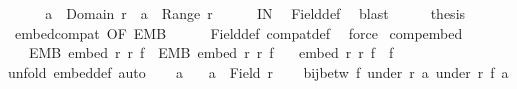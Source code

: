 \begin{isabellebody}
\ {\isacharminus}{\kern0pt}\isanewline
\ \ \isamarkupfalse%
\ {\isachardoublequoteopen}a\ {\isasymin}\ Domain\ r\ {\isasymor}\ a\ {\isasymin}\ Range\ r{\isachardoublequoteclose}\isanewline
\ \ \ \ \isamarkupfalse%
\ IN\ \isamarkupfalse%
\ Field{\isacharunderscore}{\kern0pt}def\ \isamarkupfalse%
\ blast\isanewline
\ \ \isamarkupfalse%
\ \isamarkupfalse%
\ {\isacharquery}{\kern0pt}thesis\isanewline
\ \ \ \ \isamarkupfalse%
\ embed{\isacharunderscore}{\kern0pt}compat\ {\isacharbrackleft}{\kern0pt}OF\ EMB{\isacharbrackright}{\kern0pt}\isanewline
\ \ \ \ \isamarkupfalse%
\ Field{\isacharunderscore}{\kern0pt}def\ compat{\isacharunderscore}{\kern0pt}def\ \isamarkupfalse%
\ force\isanewline
{}\isamarkupfalse%
%
\endisatagproof
{\isafoldproof}%
%
\isadelimproof
\isanewline
%
\endisadelimproof
\isanewline
{}\isamarkupfalse%
\ comp{\isacharunderscore}{\kern0pt}embed{\isacharcolon}{\kern0pt}\isanewline
\ \ \ EMB{\isacharcolon}{\kern0pt}\ {\isachardoublequoteopen}embed\ r\ r{\isacharprime}{\kern0pt}\ f{\isachardoublequoteclose}\ \ EMB{\isacharprime}{\kern0pt}{\isacharcolon}{\kern0pt}\ {\isachardoublequoteopen}embed\ r{\isacharprime}{\kern0pt}\ r{\isacharprime}{\kern0pt}{\isacharprime}{\kern0pt}\ f{\isacharprime}{\kern0pt}{\isachardoublequoteclose}\isanewline
\ \ \ {\isachardoublequoteopen}embed\ r\ r{\isacharprime}{\kern0pt}{\isacharprime}{\kern0pt}\ {\isacharparenleft}{\kern0pt}f{\isacharprime}{\kern0pt}\ {\isasymcirc}\ f{\isacharparenright}{\kern0pt}{\isachardoublequoteclose}\isanewline
%
\isadelimproof
%
\endisadelimproof
%
\isatagproof
{}\isamarkupfalse%
{\isacharparenleft}{\kern0pt}unfold\ embed{\isacharunderscore}{\kern0pt}def{\isacharcomma}{\kern0pt}\ auto{\isacharparenright}{\kern0pt}\isanewline
\ \ \isamarkupfalse%
\ a\ \isamarkupfalse%
\ {\isacharasterisk}{\kern0pt}{\isacharcolon}{\kern0pt}\ {\isachardoublequoteopen}a\ {\isasymin}\ Field\ r{\isachardoublequoteclose}\isanewline
\ \ \isamarkupfalse%
\ {\isachardoublequoteopen}bij{\isacharunderscore}{\kern0pt}betw\ f\ {\isacharparenleft}{\kern0pt}under\ r\ a{\isacharparenright}{\kern0pt}\ {\isacharparenleft}{\kern0pt}under\ r{\isacharprime}{\kern0pt}\ {\isacharparenleft}{\kern0pt}f\ a{\isacharparenright}{\kern0pt}{\isacharparenright}{\kern0pt}{\isachardoublequoteclose}\isanewline
\ \ \ \ \isamarkupfalse%

\end{isabellebody}
